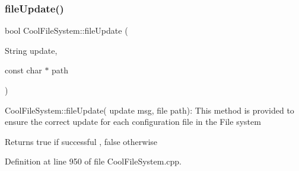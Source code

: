 \subsubsection{\texorpdfstring{file\+Update()}{fileUpdate()}}
{\footnotesize\ttfamily bool Cool\+File\+System\+::file\+Update (\begin{DoxyParamCaption}\item[{String}]{update,  }\item[{const char $\ast$}]{path }\end{DoxyParamCaption})}

Cool\+File\+System\+::file\+Update( update msg, file path)\+: This method is provided to ensure the correct update for each configuration file in the File system

\begin{DoxyReturn}{Returns}
true if successful , false otherwise 
\end{DoxyReturn}


Definition at line 950 of file Cool\+File\+System.\+cpp.


